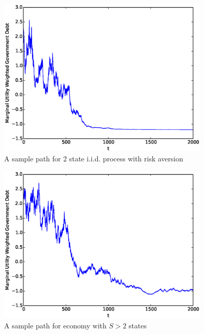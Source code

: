 \documentclass[12pt]{article}
\begin{document}
\begin{enumerate}
\begin{figure}
	\begin{center}
	\includegraphics[width=4in]{Images/2stateiid.eps}
\caption{A sample path for 2 state i.i.d. process with risk aversion}
	\end{center}
\end{figure}


	\begin{figure}
	\begin{center}
	\includegraphics[width=4in]{Images/5stateiid.eps}
\caption{A sample path  for economy with $S>2$ states}
	\end{center}
\end{figure}




\end{enumerate}
\end{document}
